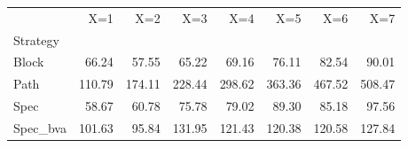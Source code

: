 \begin{tabular}{lrrrrrrr}
\toprule
 & X=1 & X=2 & X=3 & X=4 & X=5 & X=6 & X=7 \\
Strategy &  &  &  &  &  &  &  \\
\midrule
Block & 66.24 & 57.55 & 65.22 & 69.16 & 76.11 & 82.54 & 90.01 \\
Path & 110.79 & 174.11 & 228.44 & 298.62 & 363.36 & 467.52 & 508.47 \\
Spec & 58.67 & 60.78 & 75.78 & 79.02 & 89.30 & 85.18 & 97.56 \\
Spec_bva & 101.63 & 95.84 & 131.95 & 121.43 & 120.38 & 120.58 & 127.84 \\
\bottomrule
\end{tabular}
